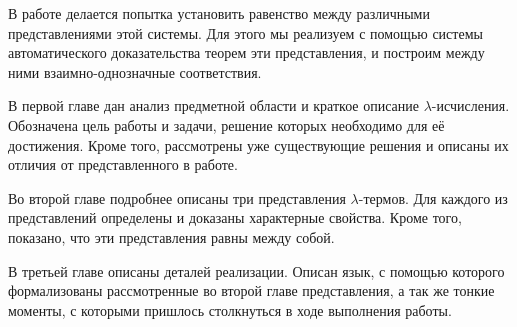 В работе делается попытка установить равенство между различными представлениями этой системы. Для этого мы реализуем с помощью системы автоматического доказательства теорем эти представления, и построим между ними взаимно-однозначные соответствия.

В первой главе дан анализ предметной области и краткое описание $\lambda$-исчисления. Обозначена цель работы и задачи, решение которых необходимо для её достижения. Кроме того, рассмотрены уже существующие решения и описаны их отличия от представленного в работе.

Во второй главе подробнее описаны три представления $\lambda$-термов. Для каждого из представлений определены и доказаны характерные свойства. Кроме того, показано, что эти представления равны между собой.

В третьей главе описаны деталей реализации. Описан язык, с помощью которого формализованы рассмотренные во второй главе представления, а так же тонкие моменты, с которыми пришлось столкнуться в ходе выполнения работы.
